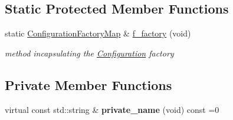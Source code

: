 \subsection*{Static Protected Member Functions}
\begin{DoxyCompactItemize}
\item 
static \mbox{\hyperlink{class_s_m_spp__di__unipi__it_1_1_configuration_aee2d0ed361f8089096aa45ffa2f07bed}{Configuration\+Factory\+Map}} \& \mbox{\hyperlink{class_s_m_spp__di__unipi__it_1_1_configuration_ac70d8005924aa4472f10d6f581ed148d}{f\+\_\+factory}} (void)
\begin{DoxyCompactList}\small\item\em method incapsulating the \mbox{\hyperlink{class_s_m_spp__di__unipi__it_1_1_configuration}{Configuration}} factory \end{DoxyCompactList}\end{DoxyCompactItemize}
\subsection*{Private Member Functions}
\begin{DoxyCompactItemize}
\item 
\mbox{\label{class_s_m_spp__di__unipi__it_1_1_configuration_aa74273c5d85179380eb4e54fd221fdc1}} 
virtual const std\+::string \& {\bfseries private\+\_\+name} (void) const =0
\end{DoxyCompactItemize}
